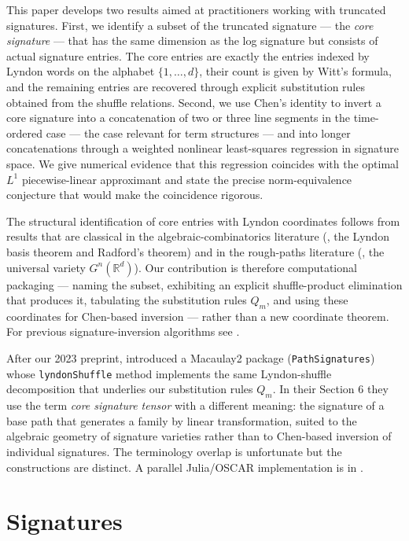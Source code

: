 \documentclass[11pt,english]{article}
\begin{document}
This paper develops two results aimed at practitioners working with
truncated signatures. First, we identify a subset of the truncated
signature --- the \emph{core signature} --- that has the same dimension
as the log signature but consists of actual signature entries. The
core entries are exactly the entries indexed by Lyndon words on the
alphabet $\{1,\ldots,d\}$, their count is given by Witt's formula,
and the remaining entries are recovered through explicit substitution
rules obtained from the shuffle relations. Second, we use Chen's identity
to invert a core signature into a concatenation of two or three line
segments in the time-ordered case --- the case relevant for term structures
--- and into longer concatenations through a weighted nonlinear least-squares
regression in signature space. We give numerical evidence that this
regression coincides with the optimal $L^{1}$ piecewise-linear approximant
and state the precise norm-equivalence conjecture that would make
the coincidence rigorous.

The structural identification of core entries with Lyndon coordinates
follows from results that are classical in the algebraic-combinatorics
literature (\cite{Reutenauer}, the Lyndon basis theorem and Radford's
theorem) and in the rough-paths literature (\cite{varieties}, the
universal variety $G^{n}(\mathbb{R}^{d})$). Our contribution is therefore
computational packaging --- naming the subset, exhibiting an explicit
shuffle-product elimination that produces it, tabulating the substitution
rules $Q_{m}$, and using these coordinates for Chen-based inversion
--- rather than a new coordinate theorem. For previous signature-inversion
algorithms see \cite{inversion}.

After our 2023 preprint, \cite{macaulay2} introduced a Macaulay2 package
(\texttt{PathSignatures}) whose \texttt{lyndonShuffle} method implements
the same Lyndon-shuffle decomposition that underlies our substitution
rules $Q_{m}$. In their Section 6 they use the term \emph{core signature
tensor} with a different meaning: the signature of a base path that
generates a family by linear transformation, suited to the algebraic
geometry of signature varieties rather than to Chen-based inversion
of individual signatures. The terminology overlap is unfortunate but
the constructions are distinct. A parallel Julia/OSCAR implementation
is in \cite{signaturetensorsjl}.

\section{Signatures}
\end{document}
